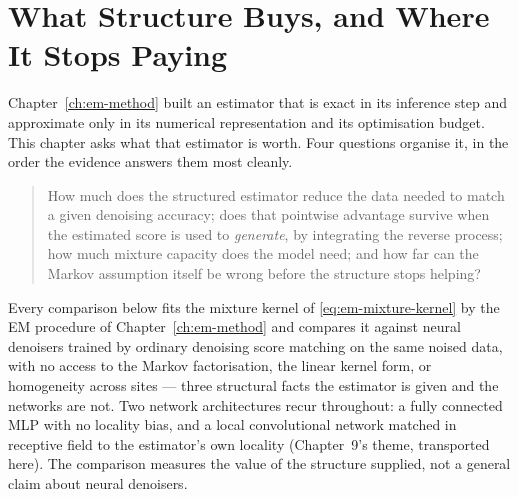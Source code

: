 %

\chapter{What Structure Buys, and Where It Stops Paying}
\label{ch:em-results}

Chapter~\ref{ch:em-method} built an estimator that is exact in its inference
step and approximate only in its numerical representation and its
optimisation budget. This chapter asks what that estimator is worth. Four
questions organise it, in the order the evidence answers them most cleanly.

\begin{quote}
How much does the structured estimator reduce the data needed to match a
given denoising accuracy; does that pointwise advantage survive when the
estimated score is used to \emph{generate}, by integrating the reverse
process; how much mixture capacity does the model need; and how far can the
Markov assumption itself be wrong before the structure stops helping?
\end{quote}

Every comparison below fits the mixture kernel of \eqref{eq:em-mixture-kernel}
by the EM procedure of Chapter~\ref{ch:em-method} and compares it against
neural denoisers trained by ordinary denoising score matching on the same
noised data, with no access to the Markov factorisation, the linear kernel
form, or homogeneity across sites --- three structural facts the estimator is
given and the networks are not. Two network architectures recur throughout: a
fully connected MLP with no locality bias, and a local convolutional network
matched in receptive field to the estimator's own locality (Chapter~9's
theme, transported here). The comparison measures the value of the structure
supplied, not a general claim about neural denoisers.

